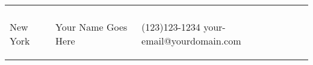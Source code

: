 %



\def \address{10080 New York,\\New York}
\def \author{Your Name Goes Here}
\def \email{your-email@yourdomain.com}
\def \phnum{(123)123-1234}

\newlength{\rcollength}\setlength{\rcollength}{3.0in}%
\begin{tabular} {
  p{}
  p{}
  p{}}
	\begin{flushleft}
		\address
	\end{flushleft}
	&
	\begin{center}
	\Large{\author}
	\end{center}
	&
	\begin{flushright}
		{\phnum}
 	    {\email} 	 
	\end{flushright}
\end{tabular}


